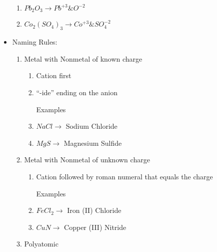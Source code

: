 \documentclass[12pt]{article}
\begin{document}
\begin{itemize}
\begin{enumerate}
  \item $Pb_2O_3 \rightarrow Pb^{+3} \& O^{-2}$

  \item $Co_2(SO_4)_3 \rightarrow Co^{+3} \& SO_4^{-2} $

\end{enumerate}

\item Naming Rules:

  \begin{enumerate}

    \item Metal with Nonmetal of known charge

    \begin{enumerate}

      \item Cation first

      \item ``-ide'' ending on the anion

        \begin{center} Examples \end{center}

      \item $NaCl \rightarrow$ Sodium Chloride

      \item $MgS \rightarrow$ Magnesium Sulfide

    \end{enumerate}

  \item Metal with Nonmetal of unknown charge

    \begin{enumerate}

      \item Cation followed by roman numeral that equals the charge

        \begin{center} Examples \end{center}

      \item $FeCl_2 \rightarrow$ Iron (II) Chloride

      \item $CuN \rightarrow$ Copper (III) Nitride

    \end{enumerate}

  \item Polyatomic

    \begin{enumerate}


\end{enumerate}
\end{enumerate}
\end{itemize}
\end{document}
